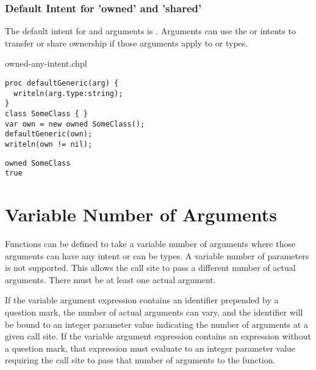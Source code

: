 \subsubsection{Default Intent for 'owned' and 'shared'}
\label{Default_Intent_for_owned_and_shared}

The default intent for  and  arguments is
. Arguments can use the  or 
intents to transfer or share ownership if those arguments apply
to  or  types.

\begin{chapelexample}{owned-any-intent.chpl}
\begin{chapel}
\begin{verbatim}
proc defaultGeneric(arg) {
  writeln(arg.type:string);
}
class SomeClass { }
var own = new owned SomeClass();
defaultGeneric(own);
writeln(own != nil);
\end{verbatim}
\end{chapel}
\begin{chapeloutput}
\begin{verbatim}
owned SomeClass
true
\end{verbatim}
\end{chapeloutput}
\end{chapelexample}

\section{Variable Number of Arguments}
\label{Variable_Length_Argument_Lists}

Functions can be defined to take a variable number of arguments where
those arguments can have any intent or can be types.  A variable
number of parameters is not supported.  This allows the call site to
pass a different number of actual arguments.  There must be at least
one actual argument.

If the variable argument expression contains an identifier prepended by a
question mark, the number of actual arguments can vary, and the identifier
will be bound to an integer parameter value indicating the number of
arguments at a given call site.
If the variable argument expression contains an expression without
a question mark, that expression must evaluate to an integer parameter value
requiring the call site to pass that number of arguments to the
function.

